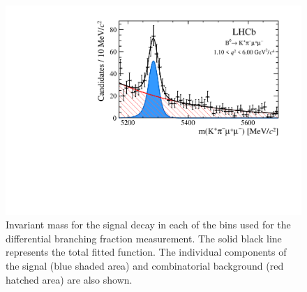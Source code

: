 \begin{figure}[!tb]
\includegraphics[width=0.48\linewidth]{figs/kpimm/massfit/fitKpimumu_q2_1p1_6p0.pdf}
 
\caption{Invariant mass \mkpimm for the signal decay \BdToKpimm in  each of the \qsq bins used for the differential branching fraction measurement. The solid black line represents the total fitted function.  The individual components of the signal (blue shaded area) and combinatorial background (red hatched area) are also shown.}
\label{fig:massfit:bins}
\end{figure}